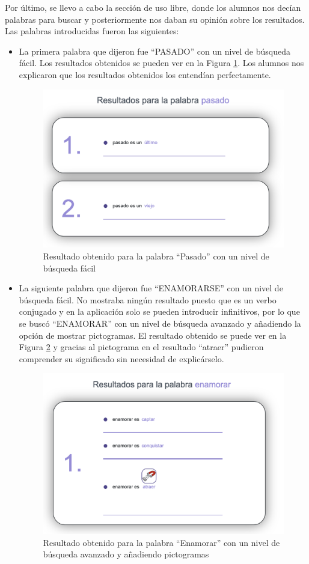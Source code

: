 Por último, se llevo a cabo la sección de uso libre, donde los alumnos nos decían palabras para buscar y posteriormente nos daban su opinión sobre los resultados. Las palabras introducidas fueron las siguientes:
\begin{itemize}
	\item La primera palabra que dijeron fue ``PASADO'' con un nivel de búsqueda fácil. Los resultados obtenidos se pueden ver en la Figura \ref{fig:pasadoFacil}. Los alumnos nos explicaron que los resultados obtenidos los entendían perfectamente.
	\begin{figure}[!h]
		\includegraphics[width=.7\textwidth]{Imagenes/Bitmap/Capitulo4/EvaluacionFinal/1pasadofacil.png}
		\centering
		\caption{Resultado obtenido para la palabra ``Pasado'' con un nivel de búsqueda fácil}
		\label{fig:pasadoFacil}
	\end{figure}

	\item La siguiente palabra que dijeron fue ``ENAMORARSE'' con un nivel de búsqueda fácil. No mostraba ningún resultado puesto que es un verbo conjugado y en la aplicación solo se pueden introducir infinitivos, por lo que se buscó ``ENAMORAR'' con un nivel de búsqueda avanzado y añadiendo la opción de mostrar pictogramas. El resultado obtenido se puede ver en la Figura \ref{fig:enamorarAvanzado} y gracias al pictograma en el resultado ``atraer'' pudieron comprender su significado sin necesidad de explicárselo.
	\begin{figure}[!h]
		\includegraphics[width=.7\textwidth]{Imagenes/Bitmap/Capitulo4/EvaluacionFinal/2enamoraravanzado.png}
		\centering
		\caption{Resultado obtenido para la palabra ``Enamorar'' con un nivel de búsqueda avanzado y añadiendo pictogramas}
		\label{fig:enamorarAvanzado}
	\end{figure}


\end{itemize}
